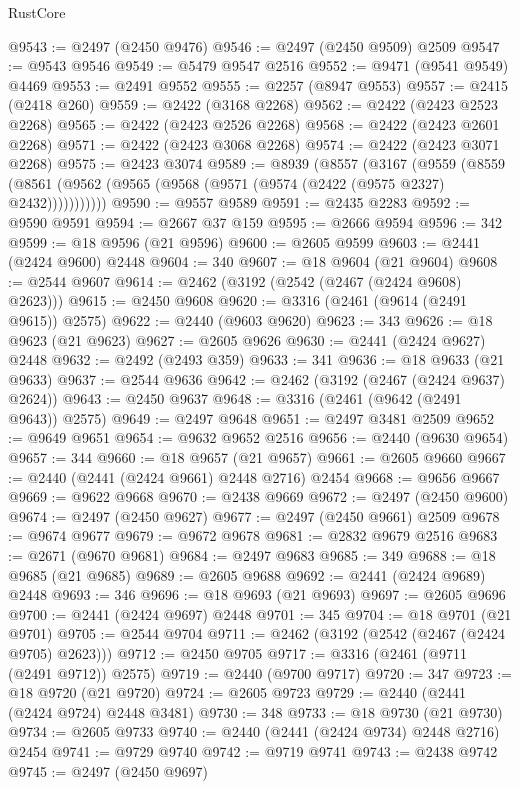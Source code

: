 \begin{lexlean}{RustCore}
\begin{coremodule}
@9543 := @2497 (@2450 @9476)
@9546 := @2497 (@2450 @9509) @2509
@9547 := @9543 @9546
@9549 := @5479 @9547 @2516
@9552 := @9471 (@9541 @9549) @4469
@9553 := @2491 @9552
@9555 := @2257 (@8947 @9553)
@9557 := @2415 (@2418 @260)
@9559 := @2422 (@3168 @2268)
@9562 := @2422 (@2423 @2523 @2268)
@9565 := @2422 (@2423 @2526 @2268)
@9568 := @2422 (@2423 @2601 @2268)
@9571 := @2422 (@2423 @3068 @2268)
@9574 := @2422 (@2423 @3071 @2268)
@9575 := @2423 @3074
@9589 := @8939
    (@8557
      (@3167
        (@9559
          (@8559 (@8561 (@9562 (@9565 (@9568 (@9571 (@9574 (@2422 (@9575 @2327) @2432)))))))))))
@9590 := @9557 @9589
@9591 := @2435 @2283
@9592 := @9590 @9591
@9594 := @2667 @37 @159
@9595 := @2666 @9594
@9596 := 342
@9599 := @18 @9596 (@21 @9596)
@9600 := @2605 @9599
@9603 := @2441 (@2424 @9600) @2448
@9604 := 340
@9607 := @18 @9604 (@21 @9604)
@9608 := @2544 @9607
@9614 := @2462 (@3192 (@2542 (@2467 (@2424 @9608) @2623)))
@9615 := @2450 @9608
@9620 := @3316 (@2461 (@9614 (@2491 @9615)) @2575)
@9622 := @2440 (@9603 @9620)
@9623 := 343
@9626 := @18 @9623 (@21 @9623)
@9627 := @2605 @9626
@9630 := @2441 (@2424 @9627) @2448
@9632 := @2492 (@2493 @359)
@9633 := 341
@9636 := @18 @9633 (@21 @9633)
@9637 := @2544 @9636
@9642 := @2462 (@3192 (@2467 (@2424 @9637) @2624))
@9643 := @2450 @9637
@9648 := @3316 (@2461 (@9642 (@2491 @9643)) @2575)
@9649 := @2497 @9648
@9651 := @2497 @3481 @2509
@9652 := @9649 @9651
@9654 := @9632 @9652 @2516
@9656 := @2440 (@9630 @9654)
@9657 := 344
@9660 := @18 @9657 (@21 @9657)
@9661 := @2605 @9660
@9667 := @2440 (@2441 (@2424 @9661) @2448 @2716) @2454
@9668 := @9656 @9667
@9669 := @9622 @9668
@9670 := @2438 @9669
@9672 := @2497 (@2450 @9600)
@9674 := @2497 (@2450 @9627)
@9677 := @2497 (@2450 @9661) @2509
@9678 := @9674 @9677
@9679 := @9672 @9678
@9681 := @2832 @9679 @2516
@9683 := @2671 (@9670 @9681)
@9684 := @2497 @9683
@9685 := 349
@9688 := @18 @9685 (@21 @9685)
@9689 := @2605 @9688
@9692 := @2441 (@2424 @9689) @2448
@9693 := 346
@9696 := @18 @9693 (@21 @9693)
@9697 := @2605 @9696
@9700 := @2441 (@2424 @9697) @2448
@9701 := 345
@9704 := @18 @9701 (@21 @9701)
@9705 := @2544 @9704
@9711 := @2462 (@3192 (@2542 (@2467 (@2424 @9705) @2623)))
@9712 := @2450 @9705
@9717 := @3316 (@2461 (@9711 (@2491 @9712)) @2575)
@9719 := @2440 (@9700 @9717)
@9720 := 347
@9723 := @18 @9720 (@21 @9720)
@9724 := @2605 @9723
@9729 := @2440 (@2441 (@2424 @9724) @2448 @3481)
@9730 := 348
@9733 := @18 @9730 (@21 @9730)
@9734 := @2605 @9733
@9740 := @2440 (@2441 (@2424 @9734) @2448 @2716) @2454
@9741 := @9729 @9740
@9742 := @9719 @9741
@9743 := @2438 @9742
@9745 := @2497 (@2450 @9697)

\end{coremodule}
\end{lexlean}
